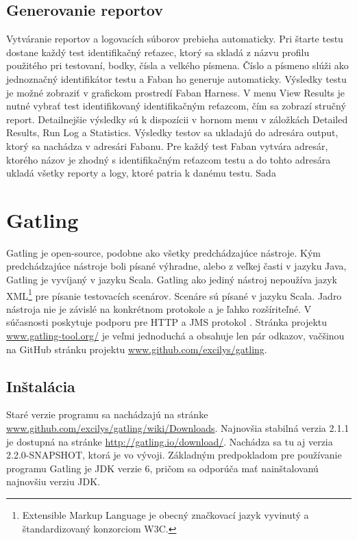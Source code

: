 \documentclass[12pt,oneside,final]{fithesis-utf8}
\begin{document}
\subsection{Generovanie reportov}
Vytváranie reportov a logovacích súborov prebieha automaticky. Pri štarte testu dostane každý test identifikačný reťazec, ktorý sa skladá z názvu profilu použitého pri testovaní, bodky, čísla a velkého písmena. Číslo a písmeno slúži ako jednoznačný identifikátor testu a Faban ho generuje automaticky. Výsledky testu je možné zobraziť v grafickom prostredí Faban Harness. V menu View Results je nutné vybrať test identifikovaný identifikačným reťazcom, čím sa zobrazí stručný report. Detailnejšie výsledky sú k dispozícii v hornom menu v záložkách Detailed Results, Run Log a Statistics. Výsledky testov sa ukladajú do adresára output, ktorý sa nachádza v adresári Fabanu. Pre každý test Faban vytvára adresár, ktorého názov je zhodný s identifikačným reťazcom testu a do tohto adresára ukladá všetky reporty a logy, ktoré patria k danému testu. Sada 

\newpage
\section{Gatling}
Gatling je open-source, podobne ako všetky predchádzajúce nástroje. Kým predchádzajúce nástroje boli písané výhradne, alebo z veľkej časti v jazyku Java, Gatling je vyvíjaný v jazyku Scala. Gatling ako jediný nástroj nepoužíva jazyk XML\footnote{Extensible Markup Language je obecný značkovací jazyk vyvinutý a štandardizovaný konzorciom W3C.} pre písanie testovacích scenárov. Scenáre sú písané v jazyku Scala. Jadro nástroja nie je závislé na konkrétnom protokole a je ľahko rozšíriteľné. V súčasnosti poskytuje podporu pre HTTP a JMS protokol \cite{Gatling}. Stránka projektu \url{www.gatling-tool.org/} je veľmi jednoduchá a obsahuje len pár odkazov, vačšinou na GitHub stránku projektu \url{www.github.com/excilys/gatling}.

\subsection{Inštalácia}
Staré verzie programu sa nachádzajú na stránke \url{www.github.com/excilys/gatling/wiki/Downloads}. Najnovšia stabilná verzia 2.1.1 je dostupná na stránke \url{http://gatling.io/download/}. Nachádza sa tu aj verzia 2.2.0-SNAPSHOT, ktorá je vo vývoji. Základným predpokladom pre používanie programu Gatling je JDK verzie 6, pričom sa odporúča mať nainštalovanú najnovšiu verziu JDK.
\end{document}
